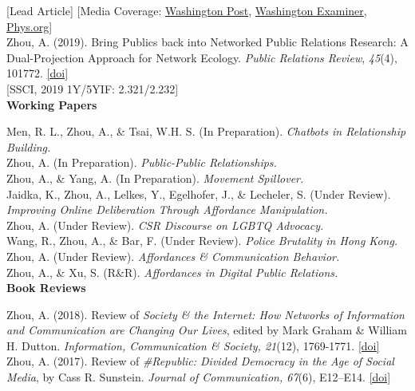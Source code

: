 \documentclass[12pt, letterpaper]{article}
\newcommand{\doi}[1]{\href{#1}{{[doi]}}}
\newcommand{\years}[1]{\marginnote{\normalsize #1}}
\begin{document}
  \years{} {[Lead Article] [Media Coverage: \href{https://www.washingtonpost.com/politics/2019/09/17/twitter-got-somewhat-more-civil-when-tweets-doubled-length-heres-how-we-know}{Washington Post}, \href{https://www.washingtonexaminer.com/opinion/twitter-conversations-have-improved-but-theres-a-better-way-to-talk-to-each-other}{Washington Examiner}, \href{https://phys.org/news/2019-09-character-limit-twitter-civil.html}{Phys.org}]\\
  \years{[1]} Zhou, A. (2019). Bring Publics back into Networked Public Relations Research: A Dual-Projection Approach for Network Ecology. \textit{Public Relations Review}, \textit{45}(4), 101772. \doi{https://doi.org/10.1016/j.pubrev.2019.03.004}\\
  \years{} {[SSCI, 2019 1Y/5YIF: 2.321/2.232]}\\

\textbf{Working Papers}

\years{[8]} Men, R. L., Zhou, A., \& Tsai, W.H. S. (In Preparation). \textit{Chatbots in Relationship Building.}\\
\years{[7]} Zhou, A. (In Preparation). \textit{Public-Public Relationships.}\\
\years{[6]} Zhou, A., \& Yang, A. (In Preparation). \textit{Movement Spillover.}\\
\years{[5]} Jaidka, K., Zhou, A., Lelkes, Y., Egelhofer, J., \& Lecheler, S. (Under Review). \textit{Improving Online Deliberation Through Affordance Manipulation.}\\
\years{[4]} Zhou, A. (Under Review). \textit{CSR Discourse on LGBTQ Advocacy.}\\
\years{[3]} Wang, R., Zhou, A., \& Bar, F. (Under Review). \textit{Police Brutality in Hong Kong.}\\
\years{[2]} Zhou, A. (Under Review). \textit{Affordances \& Communication Behavior.}\\
\years{[1]} Zhou, A., \& Xu, S. (R\&R). \textit{Affordances in Digital Public Relations.}\\

\textbf{Book Reviews}

  \years{[2]} Zhou, A. (2018). Review of \textit{Society \& the Internet: How Networks of Information and Communication are Changing Our Lives}, edited by Mark Graham \& William H. Dutton. \textit{Information, Communication \& Society, 21}(12), 1769-1771. \doi{https://doi.org/10.1080/1369118X.2018.1465577}\\
  \years{[1]} Zhou, A. (2017). Review of \textit{\#Republic: Divided Democracy in the Age of Social Media}, by Cass R. Sunstein. \textit{Journal of Communication, 67}(6), E12–E14. \doi{https://doi.org/10.1111/jcom.12344}\\

}
\end{document}
